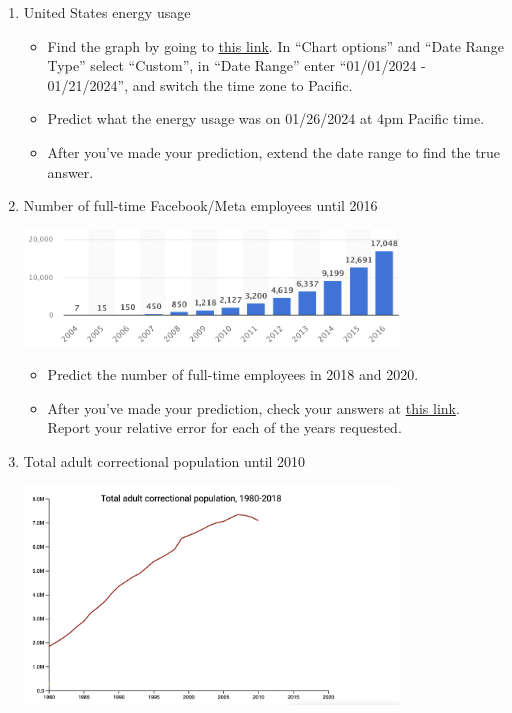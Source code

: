 \documentclass[11pt]{article}
\begin{document}
\begin{enumerate}
	\item United States energy usage
	
	\begin{itemize}
          \item Find the graph by going to \href{https://www.eia.gov/electricity/gridmonitor/expanded-view/electric_overview/US48/US48/ElectricityOverview-2/edit}{this link}. In ``Chart options'' and ``Date Range Type'' select ``Custom'', in ``Date Range'' enter ``01/01/2024 - 01/21/2024'', and switch the time zone to Pacific.
          \item Predict what the energy usage was on 01/26/2024 at 4pm Pacific time.
          \item After you've made your prediction, extend the date range to find the true answer.
	\end{itemize}
	
	\item Number of full-time Facebook/Meta employees until 2016
	
	\begin{center}	
		\includegraphics[width = 375px]{2.png}
	\end{center}

	\begin{itemize}
		\item Predict the number of full-time employees in 2018 and 2020.
            \item After you've made your prediction, check your answers at \href{https://www.globaldata.com/data-insights/technology--media-and-telecom/metas-employee-headcount/}{this link}. Report your relative error for each of the years requested.
	\end{itemize}
	
	\item Total adult correctional population until 2010

	\begin{center}	
		\includegraphics[width = 375px]{3.png}
	\end{center}



\end{enumerate}
\end{document}
